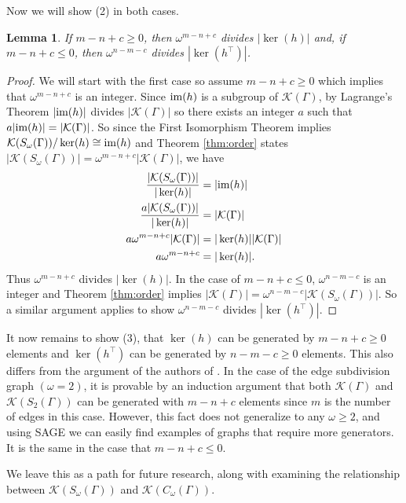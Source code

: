 \documentclass[12pt]{report}
\newtheorem{lem}[thm]{Lemma}
\theoremstyle{definition}
\def\im{{\textnormal{im}}}
\begin{document}
Now we will show (2) in both cases.
\begin{lem}
    If $m-n+c\geq 0$, then $\omega^{m-n+c}$ divides $|\ker(h)|$ and, if $m-n+c\leq 0$, then $\omega^{n-m-c}$ divides $|\ker(h^\top )|$.
\end{lem}
\begin{proof}
    We will start with the first case so assume $m-n+c \geq 0$ which implies that $\omega^{m-n+c}$ is an integer. Since $\im(h)$ is a subgroup of $\mathcal{K}(\Gamma)$, by Lagrange's Theorem $|\im(h)|$ divides $|\mathcal{K}(\Gamma)|$ so there exists an integer $a$ such that $a|\im(h)|=|\mathcal{K}(\Gamma)|$. So since the First Isomorphism Theorem implies $\mathcal{K}(S_\omega(\Gamma))/\ker(h) \cong \im(h)$ and Theorem \ref{thm:order} states $|\mathcal{K}(S_\omega(\Gamma))|=\omega^{m-n+c}|\mathcal{K}(\Gamma)|$, we have
    \begin{align*}
        \frac{|\mathcal{K}(S_\omega(\Gamma))|}{|\ker(h)|}&=|\im(h)| \\
        \frac{a|\mathcal{K}(S_\omega(\Gamma))|}{|\ker(h)|}&=|\mathcal{K}(\Gamma)| \\
        a\omega^{m-n+c}|\mathcal{K}(\Gamma)|&=|\ker(h)||\mathcal{K}(\Gamma)| \\
        a\omega^{m-n+c}&=|\ker(h)|.
    \end{align*}
    Thus $\omega^{m-n+c}$ divides $|\ker(h)|$. In the case of $m-n+c \leq 0$, $\omega^{n-m-c}$ is an integer and Theorem \ref{thm:order} implies $|\mathcal{K}(\Gamma)|=\omega^{n-m-c}|\mathcal{K}(S_\omega(\Gamma))|$. So a similar argument applies to show $\omega^{n-m-c}$ divides $|\ker(h^\top )|$.
\end{proof}
It now remains to show (3), that $\ker(h)$ can be generated by $m-n+c\geq0$ elements and $\ker(h^\top)$ can be generated by $n-m-c\geq 0$ elements. This also differs from the argument of the authors of \cite{reiner}. In the case of the edge subdivision graph $(\omega =2)$, it is provable by an induction argument that both $\mathcal{K}(\Gamma)$ and $\mathcal{K}(S_2(\Gamma))$ can be generated with $m-n+c$ elements since $m$ is the number of edges in this case. However, this fact does not generalize to any $\omega \geq 2$, and using SAGE we can easily find examples of graphs that require more generators. It is the same in the case that $m-n+c \leq 0$.\par
We leave this as a path for future research, along with examining the relationship between $\mathcal{K}(S_\omega(\Gamma))$ and $\mathcal{K}(C_\omega(\Gamma))$.
\end{document}
